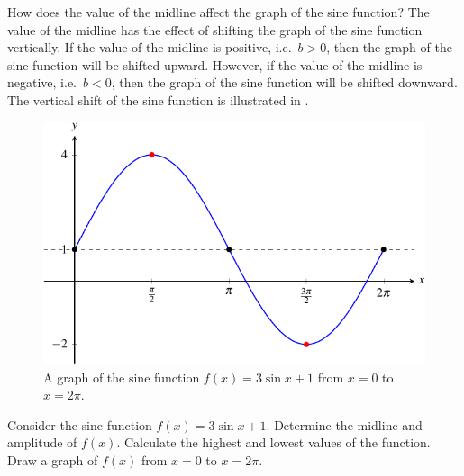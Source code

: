 \documentclass[a4paper,oneside,12pt]{article}
\begin{document}
How does the value of the midline affect the graph of the sine
function?  The value of the midline has the effect of shifting the
graph of the sine function vertically.  If the value of the midline is
positive, i.e.~$b > 0$, then the graph of the sine function will be
shifted upward.  However, if the value of the midline is negative,
i.e.~$b < 0$, then the graph of the sine function will be shifted
downward.  The vertical shift of the sine function is illustrated in
.

\begin{figure}[!htbp]
\centering
\includegraphics[scale=1.1]{image/13/3-sin-1.pdf}
\caption{%
  A graph of the sine function $f(x) = 3 \sin x + 1$ from $x = 0$ to
  $x = 2\pi$.
}
\label{fig:trigonometric:sine_3_sin_1}
\end{figure}

\begin{example}
Consider the sine function $f(x) = 3 \sin x + 1$.  Determine the
midline and amplitude of $f(x)$.  Calculate the highest and lowest
values of the function.  Draw a graph of $f(x)$ from $x = 0$ to
$x = 2\pi$.
\end{example}
\end{document}
